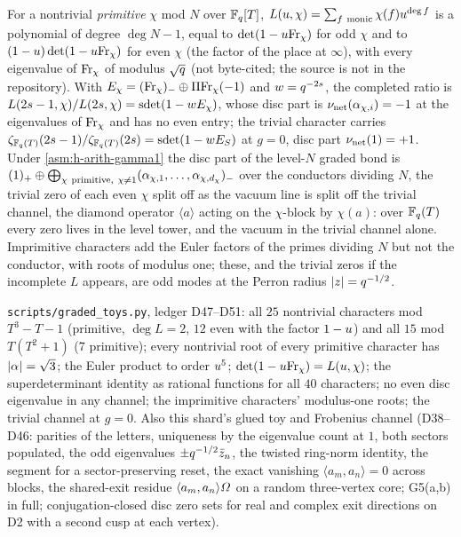 \begin{proposition}
\label{prop:character-channel-graded-bond}
For a nontrivial \emph{primitive} $\chi$ mod $N$ over $\mathbb F_q[T]$, $L(\uz,\chi) = \sum_{f\ \mathrm{monic}}\chi(f)\uz^{\deg f}$ is
a polynomial of degree $\deg N-1$, equal to $\det(1-u\mathrm{Fr}_\chi)$ for odd $\chi$ and to $(1-u)\det(1-u\mathrm{Fr}_\chi)$
for even $\chi$ (the factor of the place at $\infty$), with every eigenvalue of $\mathrm{Fr}_\chi$ of modulus
$\sqrt{q}$ \cite{rosen2002function} (not byte-cited; the source is not in the repository). With $E_\chi = (\mathrm{Fr}_\chi)_-\oplus\Pi\mathrm{Fr}_\chi(-1)$ and $w = q^{-2s}$, the
completed ratio is $L(2s-1,\chi)/L(2s,\chi) = \operatorname{sdet}(1-wE_\chi)$, whose disc part is $\nu_{\mathrm{net}}(\alpha_{\chi,i}) = -1$
at the eigenvalues of $\mathrm{Fr}_\chi$ and has no even entry; the trivial character carries
$\zeta_{\mathbb F_q(T)}(2s-1)/\zeta_{\mathbb F_q(T)}(2s) = \operatorname{sdet}(1-wE_S)$ at $g = 0$, disc part $\nu_{\mathrm{net}}(1) = +1$. Under
\cref{asm:h-arith-gamma1} the disc part of the level-$N$ graded bond is
$(1)_+\oplus\bigoplus_{\chi\ \mathrm{primitive},\ \chi\ne1}(\alphaw{\chi,1},\dots,\alphaw{\chi,d_\chi})_-$ over the conductors
dividing $N$, the trivial zero of each even $\chi$ split off as the vacuum line is split off the trivial channel, the
diamond operator $\langle a\rangle$ acting on the $\chi$-block by $\chi(a)$: over $\mathbb F_q(T)$ every zero lives in the level
tower, and the vacuum in the trivial channel alone. Imprimitive characters add the Euler factors of the primes
dividing $N$ but not the conductor, with roots of modulus one; these, and the trivial zeros if the incomplete $L$
appears, are odd modes at the Perron radius $|z| = q^{-1/2}$.
\end{proposition}

\begin{numerical}
\label{num:character-channels}
\texttt{scripts/graded\_toys.py}, ledger D47--D51: all $25$ nontrivial characters mod $T^3-T-1$ (primitive, $\deg L = 2$,
$12$ even with the factor $1-u$) and all $15$ mod $T(T^2+1)$ ($7$ primitive); every nontrivial root of every primitive
character has $|\alpha_{}| = \sqrt3$; the Euler product to order $u^5$; $\det(1-u\mathrm{Fr}_\chi) = L(u,\chi)$; the
superdeterminant identity as rational functions for all $40$ characters; no even disc eigenvalue in any channel; the
imprimitive characters' modulus-one roots; the trivial channel at $g = 0$. Also this shard's glued toy and Frobenius channel (D38--D46:
parities of the letters, uniqueness by the eigenvalue count at $1$, both sectors populated, the odd eigenvalues
$\pm q^{-1/2}\bar z_n$, the twisted ring-norm identity, the segment for a sector-preserving reset, the exact vanishing
$\langle a_m,a_n\rangle = 0$ across blocks, the shared-exit residue $\langle a_m,a_n\rangle\varOmega$ on a random three-vertex
core; G5(a,b) in full; conjugation-closed disc zero sets for real and complex exit
directions on D2 with a second cusp at each vertex).
\end{numerical}

